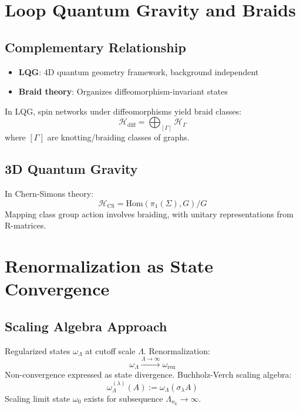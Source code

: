 \documentclass[aps,prl,reprint]{revtex4-2}
\begin{document}
\section{Loop Quantum Gravity and Braids}

\subsection{Complementary Relationship}

\begin{itemize}
\item \textbf{LQG}: 4D quantum geometry framework, background independent

\item \textbf{Braid theory}: Organizes diffeomorphism-invariant states
\end{itemize}

In LQG, spin networks under diffeomorphisms yield braid classes: 
\begin{equation*}
\mathcal{H}_{\text{diff}} = \bigoplus_{[\Gamma]} \mathcal{H}_{\Gamma} 
\end{equation*}
where $[\Gamma]$ are knotting/braiding classes of graphs.

\subsection{3D Quantum Gravity}

In Chern-Simons theory: 
\begin{equation*}
\mathcal{H}_{\text{CS}} = \text{Hom}(\pi_1(\Sigma), G)/G 
\end{equation*}
Mapping class group action involves braiding, with unitary representations
from R-matrices.

\section{Renormalization as State Convergence}

\subsection{Scaling Algebra Approach}

Regularized states $\omega _{\Lambda }$ at cutoff scale $\Lambda $.
Renormalization: 
\begin{equation*}
\omega _{\Lambda }\xrightarrow{\Lambda \to \infty}\omega _{\text{ren}}
\end{equation*}%
Non-convergence expressed as state divergence. Buchholz-Verch scaling
algebra: 
\begin{equation*}
\omega _{\Lambda }^{(\lambda )}(A):=\omega _{\Lambda }(\sigma _{\lambda }A)
\end{equation*}%
Scaling limit state $\omega _{0}$ exists for subsequence $\Lambda
_{n_{k}}\rightarrow \infty $.
\end{document}
